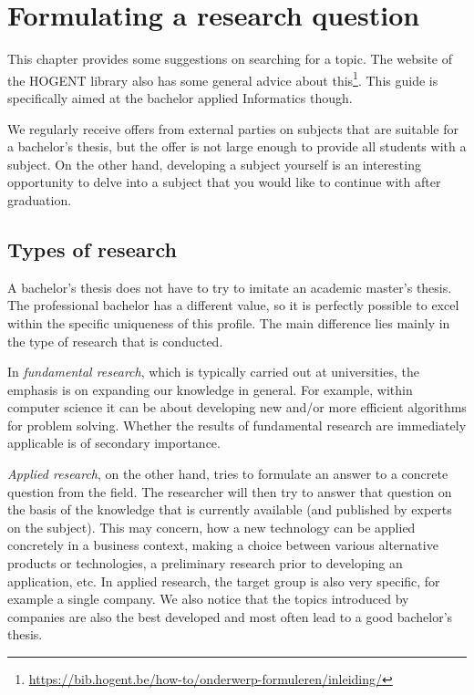 \chapter{Formulating a research question}
\label{ch:researchquestion}

This chapter provides some suggestions on searching for a topic. The website of the HOGENT library also has some general advice about this\footnote{\url{https://bib.hogent.be/how-to/onderwerp-formuleren/inleiding/}}. This guide is specifically aimed at the bachelor applied Informatics though.

We regularly receive offers from external parties on subjects that are suitable for a bachelor's thesis, but the offer is not large enough to provide all students with a subject. On the other hand, developing a subject yourself is an interesting opportunity to delve into a subject that you would like to continue with after graduation.

\section{Types of research}
\label{sec:researchtypes}

A bachelor's thesis does not have to try to imitate an academic master's thesis. The professional bachelor has a different value, so it is perfectly possible to excel within the specific uniqueness of this profile. The main difference lies mainly in the type of research that is conducted.

In \emph{fundamental research}, which is typically carried out at universities, the emphasis is on expanding our knowledge in general. For example, within computer science it can be about developing new and/or more efficient algorithms for problem solving. Whether the results of fundamental research are immediately applicable is of secondary importance.

\emph{Applied research}, on the other hand, tries to formulate an answer to a concrete question from the field. The researcher will then try to answer that question on the basis of the knowledge that is currently available (and published by experts on the subject). This may concern, how a new technology can be applied concretely in a business context, making a choice between various alternative products or technologies, a preliminary research prior to developing an application, etc. In applied research, the target group is also very specific, for example a single company. We also notice that the topics introduced by companies are also the best developed and most often lead to a good bachelor's thesis.

